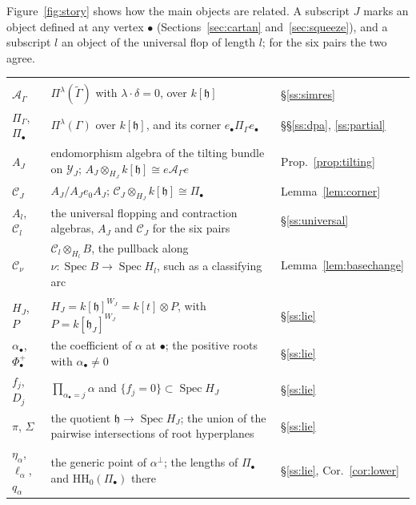\documentclass[11pt]{amsart}
\makeatletter
\numberwithin{table}{section}
\numberwithin{figure}{section}
\numberwithin{equation}{section}
\theoremstyle{definition}
\theoremstyle{plain}
\newcommand{\cC}{\mathcal{C}}
\newcommand{\cA}{\mathcal{A}}
\newcommand{\cY}{\mathcal{Y}}
\newcommand{\h}{\mathfrak{h}}
\newcommand{\bul}{\bullet}
\newcommand{\tGamma}{\widetilde{\Gamma}}
\newcommand{\HH}{\mathrm{HH}}
\DeclareMathOperator{\Spec}{Spec}
\renewcommand\paragraph{\@startsection{paragraph}{4}{\z@}{\medskipamount}{-.5em}{\normalfont\bfseries}}
\makeatother
\begin{document}
\paragraph{Notation.} Figure~\ref{fig:story} shows how the main objects are related. A subscript $J$ marks an object defined at any vertex $\bul$ (Sections~\ref{sec:cartan} and~\ref{sec:squeeze}), and a subscript $l$ an object of the universal flop of length $l$; for the six pairs the two agree.
{
\small
\renewcommand{\arraystretch}{1.1}
\begin{xltabular}{\textwidth}{@{}>{\raggedright}p{2.6cm} X l@{}}
 \\*
$\cA_\Gamma$ & $\Pi^\lambda(\tGamma)$ with $\lambda\cdot\delta = 0$, over $k[\h]$ & \S\ref{ss:simres} \\
$\Pi_\Gamma$, $\Pi_\bul$ & $\Pi^\lambda(\Gamma)$ over $k[\h]$, and its corner $e_\bul\Pi_\Gamma e_\bul$ & \S\S\ref{ss:dpa}, \ref{ss:partial} \\
$A_J$ & endomorphism algebra of the tilting bundle on $\cY_J$; $A_J \otimes_{H_J} k[\h] \cong e\cA_\Gamma e$ & Prop.~\ref{prop:tilting} \\
$\cC_J$ & $A_J/A_Je_0A_J$; $\cC_J \otimes_{H_J} k[\h] \cong \Pi_\bul$ & Lemma~\ref{lem:corner} \\
$A_l$, $\cC_l$ & the universal flopping and contraction algebras, $A_J$ and $\cC_J$ for the six pairs & \S\ref{ss:universal} \\
$\cC_\nu$ & $\cC_l \otimes_{H_l} B$, the pullback along $\nu\colon \Spec B \to \Spec H_l$, such as a classifying arc & Lemma~\ref{lem:basechange} \\[3pt]
 \\*
$H_J$, $P$ & $H_J = k[\h]^{W_J} = k[t] \otimes P$, with $P = k[\h_J]^{W_J}$ & \S\ref{ss:lie} \\
$\alpha_\bul$, $\Phi^+_\bul$ & the coefficient of $\alpha$ at $\bul$; the positive roots with $\alpha_\bul \neq 0$ & \S\ref{ss:lie} \\
$f_j$, $D_j$ & $\prod_{\alpha_\bul = j}\alpha$ and $\{f_j = 0\} \subset \Spec H_J$ & \S\ref{ss:lie} \\
$\pi$, $\Sigma$ & the quotient $\h \to \Spec H_J$; the union of the pairwise intersections of root hyperplanes & \S\ref{ss:lie} \\
$\eta_\alpha$, $\ell_\alpha$, $q_\alpha$ & the generic point of $\alpha^\perp$; the lengths of $\Pi_\bul$ and $\HH_0(\Pi_\bul)$ there & \S\ref{ss:lie}, Cor.~\ref{cor:lower} \\

\end{xltabular}}
\end{document}
